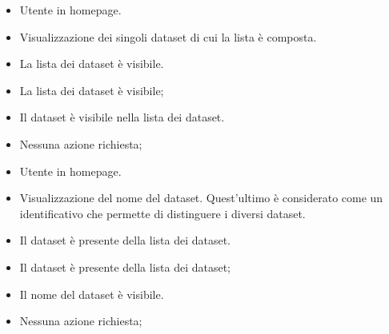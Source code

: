     \UCdsc
    { %
        \begin{itemize}
            \item Utente in homepage.
        \end{itemize}
    }
    { %
        \begin{itemize}
            \item Visualizzazione dei singoli dataset di cui la lista è composta.
        \end{itemize}
    }
    { %
        \begin{itemize}
            \item La lista dei dataset è visibile.
        \end{itemize}
    }
    { %
        \begin{itemize}
            \item La lista dei dataset è visibile;
            \item Il dataset è visibile nella lista dei dataset.
        \end{itemize}
    }
    { %
        \begin{itemize}
            \item Nessuna azione richiesta;
        \end{itemize}
    }

    \UCdsc
    { %
        \begin{itemize}
            \item Utente in homepage.
        \end{itemize}
    }
    { %
        \begin{itemize}
            \item Visualizzazione del nome del dataset. Quest'ultimo è considerato come un identificativo che permette di distinguere i diversi dataset.
        \end{itemize}
    }
    { %
        \begin{itemize}
            \item Il dataset è presente della lista dei dataset.
        \end{itemize}
    }
    { %
        \begin{itemize}
            \item Il dataset è presente della lista dei dataset;
            \item Il nome del dataset è visibile.
        \end{itemize}
    }
    { %
        \begin{itemize}
            \item Nessuna azione richiesta;
        \end{itemize}
    }


